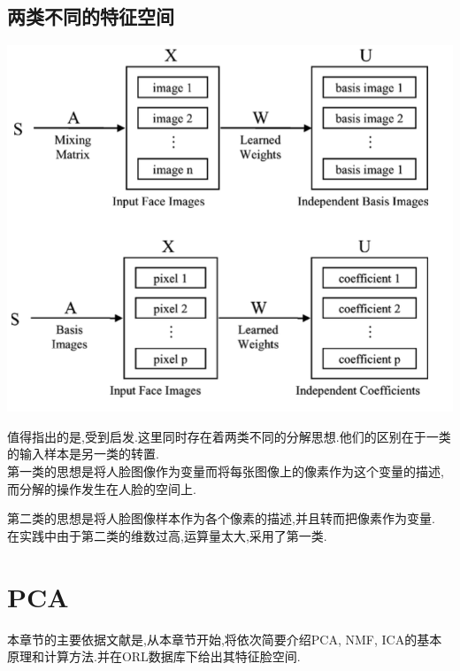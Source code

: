 \subsection{两类不同的特征空间}
\label{sec:arch2}
\begin{center}
\begin{minipage}[t]{\linewidth}
\center
{
\includegraphics[scale=1]{Img/ica_c1c2.png} 
}
\end{minipage}
\medskip
\end{center}
值得指出的是,受到\cite{draper2003recognizing}启发.这里同时存在着两类不同的分解思想.他们的区别在于一类的输入样本是另一类的转置.\\



第一类的思想是将人脸图像作为变量而将每张图像上的像素作为这个变量的描述,而分解的操作发生在人脸的空间上.


第二类的思想是将人脸图像样本作为各个像素的描述,并且转而把像素作为变量.
\\
在实践中由于第二类的维数过高,运算量太大,采用了第一类.

\section{PCA}
本章节的主要依据文献是\cite{turk1991eigenfaces, turk1991face},从本章节开始,将依次简要介绍PCA, NMF, ICA的基本原理和计算方法.并在ORL数据库下给出其特征脸空间. \newline

